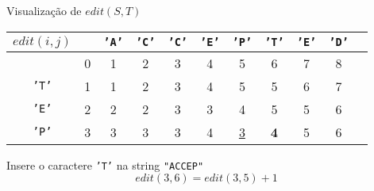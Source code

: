 \begin{frame}[fragile]{Visualização de $edit(S,T)$}

    \begin{table}
        \centering

        \begin{tabular}{c|cccccccccc} $edit(i, j)$ &
        & \textcolor{red!80!black}{\texttt{'A'}}
        & \textcolor{red!80!black}{\texttt{'C'}}
        & \textcolor{red!80!black}{\texttt{'C'}}
        & \textcolor{red!80!black}{\texttt{'E'}}
        & \textcolor{red!80!black}{\texttt{'P'}}
        & \textcolor{red!80!black}{\texttt{'T'}}
        & \textcolor{red!80!black}{\texttt{'E'}}
        & \textcolor{red!80!black}{\texttt{'D'}}\\
        \hline
&0 &1&2&3&4&5&6&7&8\\
\textcolor{red!80!black}{\texttt{'T'}}
&1 &1&2&3&4&5&5&6&7\\
\textcolor{red!80!black}{\texttt{'E'}}
&2 &2&2&3&3&4&5&5&6\\
\textcolor{red!80!black}{\texttt{'P'}}
&3 &3&3&3&4&\underline{3}&\textbf{4}&5&6\\
        \end{tabular}

    \end{table}

    Insere o caractere
\textcolor{red!80!black}{\texttt{'T'}}
    na string 
\textcolor{red!80!black}{\texttt{"ACCEP"}}
    \[
        edit(3, 6) = edit(3, 5) + 1
    \]    


\end{frame}


